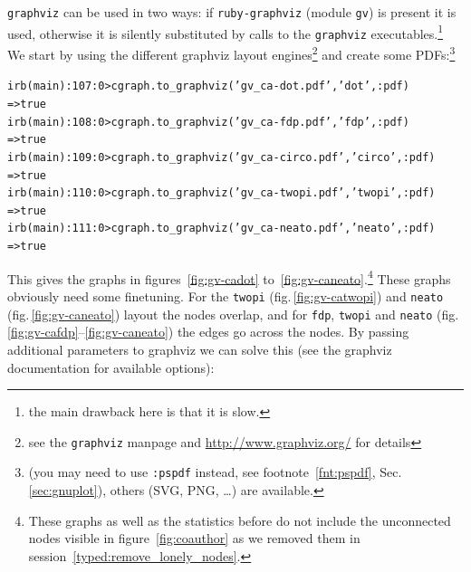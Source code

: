 \documentclass[a4paper]{scrartcl}
\newcounter{tcounter}
\newcommand{\tcount}{\makebox[0pt][r]{\tiny\thetcounter~}}
\newenvironment{typed}{\refstepcounter{tcounter}\bgroup\setlength{\topsep}{0pt}\renewcommand{\FrameCommand}[1]{\fcolorbox{black!30}{bgcolor}{##1}\tcount}\MakeFramed{\FrameRestore}\begin{alltt}\small}{\end{alltt}\endMakeFramed\egroup\par\aftergroup\noindent\aftergroup\ignorespaces}
\newcommand{\file}[1]{\texttt{\color{file}#1}}
\newcommand{\code}[1]{\texttt{\color{code}#1}}
\newcommand{\cmd}[1]{\texttt{\color{cmd}#1}}
\newcommand{\p}{\textcolor{prompt}}
\renewcommand{\c}{\textcolor{cmd}}
\begin{document}
\file{graphviz} can be used in two ways: if \file{ruby-graphviz}
(module \file{gv}) is present it is used, otherwise it is silently
substituted by calls to the \file{graphviz} executables.\footnote{the
  main drawback here is that it is slow.} We start by using the
different graphviz layout engines\footnote{see the \file{graphviz} manpage and
\url{http://www.graphviz.org/} for details} and create some PDFs:\footnote{(you may need to use \cmd{:pspdf} instead, see
  footnote~\ref{fnt:pspdf}, Sec.\,\ref{sec:gnuplot}), others
  (SVG, PNG, \dots) are available.}
\begin{typed}
\p{irb(main):107:0>} \c{cgraph.to_graphviz('gv_ca-dot.pdf','dot', :pdf)}
=> true
\p{irb(main):108:0>} \c{cgraph.to_graphviz('gv_ca-fdp.pdf','fdp', :pdf)}
=> true
\p{irb(main):109:0>} \c{cgraph.to_graphviz('gv_ca-circo.pdf','circo', :pdf)}
=> true
\p{irb(main):110:0>} \c{cgraph.to_graphviz('gv_ca-twopi.pdf','twopi', :pdf)}
=> true
\p{irb(main):111:0>} \c{cgraph.to_graphviz('gv_ca-neato.pdf','neato', :pdf)}
=> true
\end{typed}
This gives the graphs in figures~\ref{fig:gv-cadot}
to~\ref{fig:gv-caneato}.\footnote{These graphs as well as the
  statistics before do not include the unconnected nodes visible in
  figure~\ref{fig:coauthor} as we removed them in session~\ref{typed:remove_lonely_nodes}.}  These graphs obviously need some
finetuning. For the \code{twopi} (fig.\,\ref{fig:gv-catwopi}) and
\code{neato} (fig.\,\ref{fig:gv-caneato}) layout the nodes overlap,
and for \code{fdp}, \code{twopi} and \code{neato}
(fig.\,\ref{fig:gv-cafdp}--\ref{fig:gv-caneato}) the edges go across
the nodes. By passing additional parameters to graphviz we can solve
this (see the graphviz documentation for available options):
\end{document}
